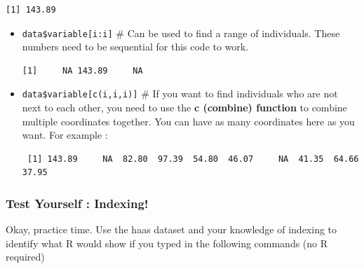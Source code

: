 \documentclass[
  letterpaper,
  DIV=11,
  numbers=noendperiod,
  oneside]{scrreprt}
\newenvironment{Shaded}{\begin{snugshade}}{\end{snugshade}}
\newcommand{\DecValTok}[1]{\textcolor[rgb]{0.68,0.00,0.00}{#1}}
\newcommand{\FunctionTok}[1]{\textcolor[rgb]{0.28,0.35,0.67}{#1}}
\newcommand{\NormalTok}[1]{\textcolor[rgb]{0.00,0.23,0.31}{#1}}
\newcommand{\SpecialCharTok}[1]{\textcolor[rgb]{0.37,0.37,0.37}{#1}}
\begin{document}
\begin{verbatim}
[1] 143.89
\end{verbatim}

\begin{itemize}
\item
  \texttt{data\$variable{[}i:i{]}} \# Can be used to find a range of
  individuals. These numbers need to be sequential for this code to
  work.

\begin{Shaded}
\end{Shaded}

\begin{verbatim}
[1]     NA 143.89     NA
\end{verbatim}
\item
  \texttt{data\$variable{[}c(i,i,i){]}} \# If you want to find
  individuals who are not next to each other, you need to use the
  \textbf{c (combine) function} to combine multiple coordinates
  together. You can have as many coordinates here as you want. For
  example :~

\begin{Shaded}
\end{Shaded}

\begin{verbatim}
 [1] 143.89     NA  82.80  97.39  54.80  46.07     NA  41.35  64.66  37.95
\end{verbatim}
\end{itemize}

\subsubsection{Test Yourself : Indexing!}\label{test-yourself-indexing}

Okay, practice time. Use the haas dataset and your knowledge of indexing
to identify what R would show if you typed in the following commands (no
R required)
\end{document}
